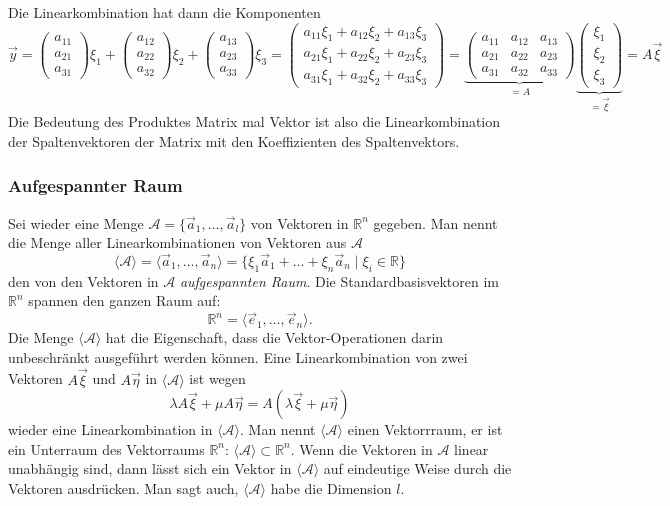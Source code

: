 Die Linearkombination hat dann die Komponenten
\[
\vec{y}
=
\begin{pmatrix}a_{11}\\a_{21}\\a_{31}\end{pmatrix}
\xi_1
+
\begin{pmatrix}a_{12}\\a_{22}\\a_{32}\end{pmatrix}
\xi_2
+
\begin{pmatrix}a_{13}\\a_{23}\\a_{33}\end{pmatrix}
\xi_3
=
\begin{pmatrix}
a_{11}\xi_1+a_{12}\xi_2+a_{13}\xi_3\\
a_{21}\xi_1+a_{22}\xi_2+a_{23}\xi_3\\
a_{31}\xi_1+a_{32}\xi_2+a_{33}\xi_3
\end{pmatrix}
=
\underbrace{
\begin{pmatrix}
a_{11}&a_{12}&a_{13}\\
a_{21}&a_{22}&a_{23}\\
a_{31}&a_{32}&a_{33}
\end{pmatrix}}_{\displaystyle=A}
\underbrace{
\begin{pmatrix}
\xi_1\\\xi_2\\\xi_3
\end{pmatrix}}_{\displaystyle=\vec{\xi}}
=
A\vec{\xi}
\]
Die Bedeutung des Produktes Matrix mal Vektor ist also die Linearkombination
der Spaltenvektoren der Matrix mit den Koeffizienten des Spaltenvektors.

\subsubsection{Aufgespannter Raum}
Sei wieder eine Menge $\mathcal{A}=\{\vec{a}_1,\dots,\vec{a}_l\}$
von Vektoren in $\mathbb R^n$ gegeben.
Man nennt die Menge aller Linearkombinationen von Vektoren aus
$\mathcal{A}$
\[
\langle
\mathcal{A}
\rangle
=
\langle
\vec{a}_1,\dots,\vec{a}_n
\rangle
=
\{
\xi_1\vec{a}_1+\dots+\xi_n\vec{a}_n\;|\; \xi_i\in\mathbb R
\}
\]
den von den Vektoren in $\mathcal{A}$ {\em aufgespannten Raum}.
\label{skript:affin:koordinaten:aufgespannt}
Die Standardbasisvektoren im $\mathbb R^n$ spannen den ganzen Raum
auf:
\[
\mathbb R^n = \langle \vec{e}_1,\dots,\vec{e}_n\rangle.
\]
Die Menge $\langle\mathcal{A}\rangle$ hat die Eigenschaft, dass die
Vektor-Operationen darin unbeschränkt ausgeführt werden können.
Eine Linearkombination von zwei 
Vektoren $A\vec{\xi}$ und $A\vec{\eta}$ in $\langle\mathcal{A}\rangle$
ist wegen
\[
\lambda A\vec{\xi} + \mu A\vec{\eta}
=
A(\lambda\vec{\xi} + \mu\vec{\eta})
\]
wieder eine Linearkombination in $\langle\mathcal{A}\rangle$.
Man nennt $\langle\mathcal{A}\rangle$ einen Vektorrraum, er ist
ein Unterraum des Vektorraums $\mathbb R^n$: $\langle\mathcal{A}\rangle
\subset\mathbb R^n$.
Wenn die Vektoren in $\mathcal{A}$ linear unabhängig sind, dann lässt
sich ein Vektor in $\langle\mathcal{A}\rangle$ auf eindeutige Weise
durch die Vektoren ausdrücken.
Man sagt auch, $\langle\mathcal{A}\rangle$ habe die Dimension $l$.

